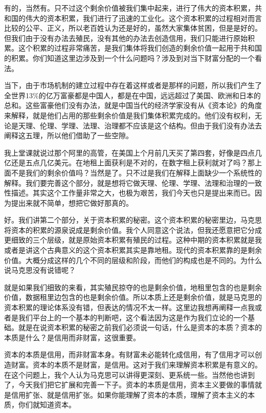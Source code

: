 \documentclass[UTF8, 12pt, a4paper]{ctexrep}
\begin{document}
有的，当然有。只不过这个剩余价值被我们集中起来，进行了伟大的资本积累，共和国的伟大的资本积累，我们进行了迅速的工业化。这个资本积累的过程相对而言比较的公平、正义，所以老百姓认为还是好的，虽然大家集体贫困，但是是好的。但我们由于没有办法去殖民，没有其他的办法去创造信用，我们只能进行原始积累。这个积累的过程非常痛苦，是我们集体将我们创造的剩余价值一起用于共和国的积累。你们知道这里边涉及到一个什么问题吗？涉及到对当下财富分配的一个看法。

当下，由于市场机制的建立过程中存在着这样或者是那样的问题，所以我们产生了全世界13\%的亿万富豪都是中国人，都是在中国，远远超过了美国、欧洲和日本的总和。这些富豪他们没有办法，就是中国当代的经济学家没有从《资本论》的角度来解释，就是他们占用的那些剩余价值是我们集体积累完成的。他们没有权利，无论是天理、伦理、学理、法理、治理都不应该是这个结构。但由于我们没有办法去阐释这五理，所以他们借助了一些空隙。

我上堂课就说过那个阿里的高管，在美国上个月前几天买了第四套，好像是四点几亿还是五点几亿美元。在地租上面获利是不对的，在数字租上获利就对了吗？那上面不是我们的剩余价值吗？当然是了。只不过是我们在解释上面缺少一个系统性的解释。我们要完善这个部分，就是想将它做天理、伦理、学理、法理和治理的一致性描述。其实这个工作量非常之大，也极为艰苦，我们今天也只是提出来而已。因为提出来就不简单，想把它做好那真的。

好。我们讲第二个部分，关于资本积累的秘密。这个资本积累的秘密里边，马克思将资本的积累的源泉说成是剩余价值。我个人同意这个说法，但我还愿意把它分成更细致的三个层级，就是原始资本积累有殖民的过程。这种中期的资本积累就是我或者是讲这个古典意义的这个资本积累其实是靠地租。现代的资本积累靠的是剩余价值。大概分成这样的几个不同的层级和阶段，而他们的构成也是不同的。为什么说马克思没有说错呢？

就是如果我们细致的来看，其实殖民掠夺的也是剩余价值，地租里包含的也是剩余价值，数据租里边包含的也是剩余价值。所以本质上还是剩余价值，就是马克思的资本积累的理论体系没有错，但表达的情况不太一样。这里边我想再阐释一点我或者是我们平台上的一个基本的判断吧，这个看法因为这是作为我们立论的一个基础。就是在说资本积累的秘密之前我们必须说一句话，什么是资本的本质？资本的本质是什么？是信用而非财富，这很重要。

资本的本质是信用，而非财富本身。有财富未必能转化成信用，有了信用才可以创造财富。资本的本质不是财富，是信用。这对于我们来理解资本积累是有意义的。在这个问题上，我个人认为马克思可以讲得更深刻、更系统一些。当然他也讲到了，今天我们把它扩展和完善一下子。资本的本质是信用，资本主义要做的事情就是信用扩张、就是信用扩张。如果你能理解了资本的本质，理解了资本主义的本质，你们就知道资本。
\end{document}
